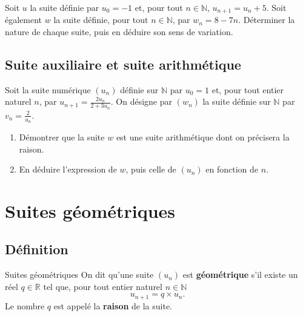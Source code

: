 \documentclass[11pt]{article}
\begin{document}
\begin{app}
  Soit $u$ la suite définie par $u_0=-1$ et, pour tout $n\in\mathbb{N}$,
  $u_{n+1}=u_n+5$. Soit également $w$ la suite définie, pour tout
  $n\in\mathbb{N}$, par $w_n = 8-7n$. Déterminer la nature de chaque suite, puis
  en déduire son sens de variation.
\end{app}

\subsection{Suite auxiliaire et suite arithmétique}
\begin{app}
  Soit la suite numérique $\left( u_n \right)$ définie sur $\mathbb{N}$ par
  $u_0=1$ et, pour tout entier naturel $n$, par $u_{n+1} = \frac{2u_n}{2+3u_n}$.
  On désigne par $\left( w_n \right)$ la suite définie sur $\mathbb{N}$ par $v_n
  = \frac{2}{u_n}$.
  \begin{enumerate}
    \item Démontrer que la suite $w$ est une suite arithmétique dont on
      précisera la raison.
    \item En déduire l'expression de $w$, puis celle de $\left( u_n \right)$ en
      fonction de $n$.
  \end{enumerate}
\end{app}

\section{Suites géométriques}
\subsection{Définition}
\begin{defi}{Suites géométriques}
  On dit qu'une suite $\left( u_n \right)$ est \textbf{géométrique} s'il existe
  un réel $q\in\mathbb{R}$ tel que, pour tout entier naturel $n\in\mathbb{N}$
  \[
    u_{n+1} = q\times u_n.
  \]
  Le nombre $q$ est appelé la \textbf{raison} de la suite.

  \begin{center}
  \end{center}
\end{defi}
\end{document}
